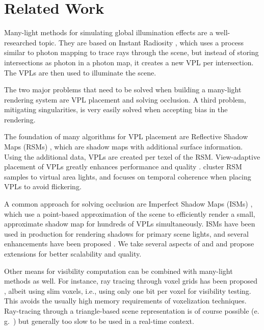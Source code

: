 \section{Related Work}

Many-light methods for simulating global illumination effects are a well-researched topic. They are based on Instant Radiosity \cite{Keller:1997:InstantRadiosity}, which uses a process similar to photon mapping to trace rays through the scene, but instead of storing intersections as photon in a photon map, it creates a new VPL per intersection. The VPLs are then used to illuminate the scene.

The two major problems that need to be solved when building a many-light rendering system are VPL placement and solving occlusion. A third problem, mitigating singularities, is very easily solved when accepting bias in the rendering.


The foundation of many algorithms for VPL placement are Reflective Shadow Maps (RSMs) \cite{Dachsbacher:2005:RSM}, which are shadow maps with additional surface information. Using the additional data, VPLs are created per texel of the RSM. View-adaptive placement of VPLs greatly enhances performance and quality \cite{ritschel2011ismsViewAdaptive}. \cite{prutkin2012reflective} cluster RSM samples to virtual area lights, and \cite{hedman2016sequential} focuses on temporal coherence when placing VPLs to avoid flickering.

A common approach for solving occlusion are Imperfect Sha\-dow Maps (ISMs) \cite{ritschel2008ism}, which use a point-based approximation of the scene to efficiently render a small, approximate shadow map for hundreds of VPLs simultaneously. ISMs have been used in production for rendering shadows for primary scene lights\cite{evans2015dreams}, and several enhancements have been proposed \cite{ritschel2011ismsViewAdaptive, hollander2011manylods, barak2013temporally}. We take several aspects of \cite{ritschel2008ism} and \cite{barak2013temporally} and propose extensions for better scalability and quality.

Other means for visibility computation can be combined with many-light methods as well. For instance, ray tracing through voxel grids has been proposed \cite{sugihara2014layered, sun2015manylightsSVO, Chen:2016:Compactvoxels}, albeit using slim voxels, i.e., using only one bit per voxel for visibility testing. This avoids the usually high memory requirements of voxelization techniques. Ray-tracing through a triangle-based scene representation is of course possible (e.\,g.\ \cite{segovia2006bidirectional}) but generally too slow to be used in a real-time context.

